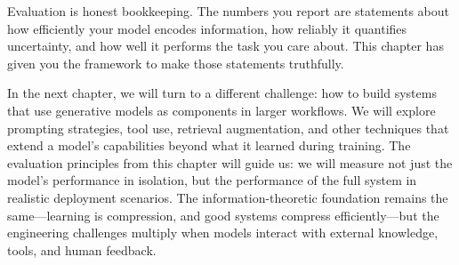 \vspace{0.3cm}

Evaluation is honest bookkeeping. The numbers you report are statements about how efficiently your model encodes information, how reliably it quantifies uncertainty, and how well it performs the task you care about. This chapter has given you the framework to make those statements truthfully.

\vspace{0.3cm}

In the next chapter, we will turn to a different challenge: how to build systems that use generative models as components in larger workflows. We will explore prompting strategies, tool use, retrieval augmentation, and other techniques that extend a model's capabilities beyond what it learned during training. The evaluation principles from this chapter will guide us: we will measure not just the model's performance in isolation, but the performance of the full system in realistic deployment scenarios. The information-theoretic foundation remains the same---learning is compression, and good systems compress efficiently---but the engineering challenges multiply when models interact with external knowledge, tools, and human feedback.
